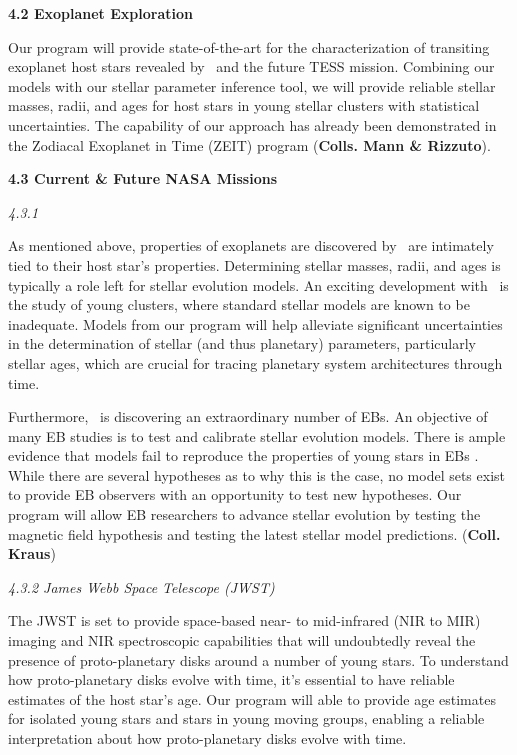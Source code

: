 {\bf 4.2 Exoplanet Exploration}

Our program will provide state-of-the-art for the characterization of transiting exoplanet host stars revealed by \kepler\ and the future TESS mission. Combining our models with our stellar parameter inference tool, we will provide reliable stellar masses, radii, and ages for host stars in young stellar clusters with statistical uncertainties. The capability of our approach has already been demonstrated in the Zodiacal Exoplanet in Time (ZEIT) program ({\bf Colls. Mann \& Rizzuto}). 

{\bf 4.3 Current \& Future NASA Missions}

{\it 4.3.1 \kepler}

As mentioned above, properties of exoplanets are discovered by \kepler\ are intimately tied to their host star's properties. Determining stellar masses, radii, and ages is typically a role left for stellar evolution models. An exciting development with \kepler\ is the study of young clusters, where standard stellar models are known to be inadequate. Models from our program will help alleviate significant uncertainties in the determination of stellar (and thus planetary) parameters, particularly stellar ages, which are crucial for tracing planetary system architectures through time.

Furthermore, \kepler\ is discovering an extraordinary number of EBs. An objective of many EB studies is to test and calibrate stellar evolution models. There is ample evidence that models fail to reproduce the properties of young stars in EBs \citep[see, e.g.,][]{Stassun2014}. While there are several hypotheses as to why this is the case, no model sets exist to provide EB observers with an opportunity to test new hypotheses. Our program will allow EB researchers to advance stellar evolution by testing the magnetic field hypothesis and testing the latest stellar model predictions. ({\bf Coll. Kraus}) 

{\it 4.3.2 James Webb Space Telescope (JWST)}

The JWST is set to provide space-based near- to mid-infrared (NIR to MIR) imaging and NIR spectroscopic capabilities that will undoubtedly reveal the presence of proto-planetary disks around a number of young stars. To understand how proto-planetary disks evolve with time, it's essential to have reliable estimates of the host star's age. Our program will able to provide age estimates for isolated young stars and stars in young moving groups, enabling a reliable interpretation about how proto-planetary disks evolve with time.

